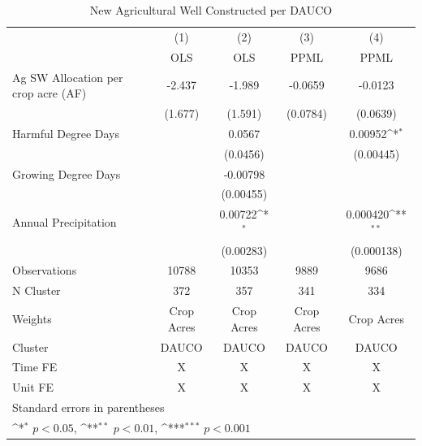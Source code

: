 \begin{table}[htbp]\centering
\def\sym#1{\ifmmode^{#1}\else\(^{#1}\)\fi}
\caption{New Agricultural Well Constructed per DAUCO}
\begin{tabular}{l*{4}{c}}
\hline\hline
                    &\multicolumn{1}{c}{(1)}&\multicolumn{1}{c}{(2)}&\multicolumn{1}{c}{(3)}&\multicolumn{1}{c}{(4)}\\
                    &\multicolumn{1}{c}{OLS}&\multicolumn{1}{c}{OLS}&\multicolumn{1}{c}{PPML}&\multicolumn{1}{c}{PPML}\\
\hline
Ag SW Allocation per crop acre (AF)&      -2.437         &      -1.989         &     -0.0659         &     -0.0123         \\
                    &     (1.677)         &     (1.591)         &    (0.0784)         &    (0.0639)         \\
[1em]
Harmful Degree Days &                     &      0.0567         &                     &     0.00952\sym{*}  \\
                    &                     &    (0.0456)         &                     &   (0.00445)         \\
[1em]
Growing Degree Days &                     &    -0.00798         &                     &                     \\
                    &                     &   (0.00455)         &                     &                     \\
[1em]
Annual Precipitation&                     &     0.00722\sym{*}  &                     &    0.000420\sym{**} \\
                    &                     &   (0.00283)         &                     &  (0.000138)         \\
\hline
Observations        &       10788         &       10353         &        9889         &        9686         \\
N Cluster           &         372         &         357         &         341         &         334         \\
Weights             &  Crop Acres         &  Crop Acres         &  Crop Acres         &  Crop Acres         \\
Cluster             &       DAUCO         &       DAUCO         &       DAUCO         &       DAUCO         \\
Time FE             &           X         &           X         &           X         &           X         \\
Unit FE             &           X         &           X         &           X         &           X         \\
\hline\hline
\multicolumn{5}{l}{\footnotesize Standard errors in parentheses}\\
\multicolumn{5}{l}{\footnotesize \sym{*} \(p<0.05\), \sym{**} \(p<0.01\), \sym{***} \(p<0.001\)}\\
\end{tabular}
\end{table}

